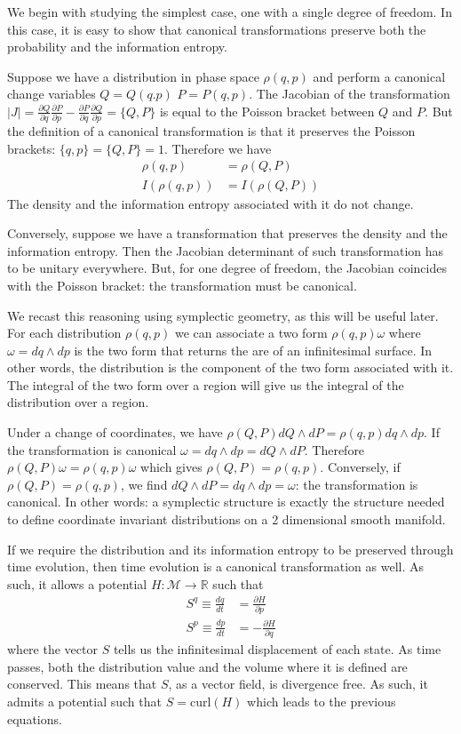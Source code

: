\documentclass[smallextended]{svjour3}
\numberwithin{equation}{section}
\theoremstyle{definition}
\begin{document}
We begin with studying the simplest case, one with a single degree of freedom. In this case, it is easy to show that canonical transformations preserve both the probability and the information entropy.

Suppose we have a distribution in phase space $\rho(q, p)$ and perform a canonical change variables $Q=Q(q.p)$ $P=P(q,p)$. The Jacobian of the transformation $|J| = \frac{\partial Q}{\partial q}\frac{\partial P}{\partial p} - \frac{\partial P}{\partial q} \frac{\partial Q}{\partial p} = \{Q, P\}$ is equal to the Poisson bracket between $Q$ and $P$. But the definition of a canonical transformation is that it preserves the Poisson brackets: $\{q,p\} = \{Q, P\} = 1$. Therefore we have
\begin{align}
\rho(q, p) &= \rho(Q,P) \\
I(\rho(q,p)) &= I(\rho(Q,P))
\end{align}
The density and the information entropy associated with it do not change.

Conversely, suppose we have a transformation that preserves the density and the information entropy. Then the Jacobian determinant of such transformation has to be unitary everywhere. But, for one degree of freedom, the Jacobian coincides with the Poisson bracket: the transformation must be canonical.

We recast this reasoning using symplectic geometry, as this will be useful later. For each distribution $\rho(q, p)$ we can associate a two form $\rho(q, p) \omega$ where $\omega=dq\wedge dp$ is the two form that returns the are of an infinitesimal surface. In other words, the distribution is the component of the two form associated with it. The integral of the two form over a region will give us the integral of the distribution over a region.

Under a change of coordinates, we have $\rho(Q, P) dQ \wedge dP = \rho(q,p) dq \wedge dp$. If the transformation is canonical $\omega = dq \wedge dp = dQ \wedge dP$. Therefore $\rho(Q, P) \omega = \rho(q,p) \omega$ which gives $\rho(Q, P) = \rho(q,p)$. Conversely, if $\rho(Q, P) = \rho(q,p)$, we find $dQ \wedge dP = dq \wedge dp = \omega$: the transformation is canonical. In other words: a symplectic structure is exactly the structure needed to define coordinate invariant distributions on a 2 dimensional smooth manifold.

If we require the distribution and its information entropy to be preserved through time evolution, then time evolution is a canonical transformation as well. As such, it allows a potential $H : \mathcal{M} \rightarrow \mathbb{R}$ such that
\begin{align}
S^q \equiv \frac{dq}{dt} &= \frac{\partial H}{\partial p} \\
S^p \equiv \frac{dp}{dt} &= - \frac{\partial H}{\partial q}
\end{align} 
where the vector $S$ tells us the infinitesimal displacement of each state. As time passes, both the distribution value and the volume where it is defined are conserved. This means that $S$, as a vector field, is divergence free. As such, it admits a potential such that $S = \mathrm{curl}(H)$ which leads to the previous equations.
\end{document}
